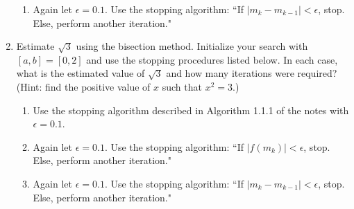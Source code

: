 \documentclass[12pt]{article}
\newif\ifans
\begin{document}
\begin{enumerate}
\begin{enumerate}
\item Again let $\epsilon=0.1$.  Use the stopping algorithm: ``If $|m_k-m_{k-1}|<\epsilon$, stop.  Else, perform another iteration."

\ifans\fbox{The solution is approximately 0.6875 after 7 iterations.}\fi

\end{enumerate}

\item Estimate $\sqrt{3}$ using the bisection method.  Initialize your search with $[a,b]=[0,2]$ and use the stopping procedures listed below.  In each case, what is the estimated value of $\sqrt{3}$ and how many iterations were required?  (Hint: find the positive value of $x$ such that $x^2=3$.)

\begin{enumerate}

\item Use the stopping algorithm described in Algorithm 1.1.1 of the notes with $\epsilon=0.1$.

\ifans\fbox{The solution is approximately 1.6875 after 5 iterations.}\fi

\item Again let $\epsilon=0.1$.  Use the stopping algorithm: ``If $|f(m_k)|<\epsilon$, stop.  Else, perform another iteration."

\ifans\fbox{The solution is approximately 1.75 after 3 iterations.}\fi

\item Again let $\epsilon=0.1$.  Use the stopping algorithm: ``If $|m_k-m_{k-1}|<\epsilon$, stop.  Else, perform another iteration."

\ifans\fbox{The solution is approximately 1.6875 after 5 iterations.}\fi

\end{enumerate}


\end{enumerate}
\end{document}
